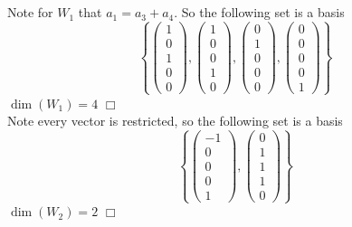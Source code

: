 \documentclass{article}
\begin{document}
\section{}
Note for $W_1$ that $a_1 = a_3 + a_4$. So the following set is a basis
$$\left\{\left(\begin{matrix}1\\0\\1\\0\\0\end{matrix}\right), \left(\begin{matrix}1\\0\\0\\1\\0\end{matrix} \right), \left(\begin{matrix}0\\1\\0\\0\\0\end{matrix}\right), \left(\begin{matrix}0\\0\\0\\0\\1\end{matrix}\right) \right\}$$
$\dim{(W_1)} = 4$ $\Box$\\
Note every vector is restricted, so the following set is a basis
$$\left\{ \left(\begin{matrix}-1\\0\\0\\0\\1\end{matrix}\right), \left(\begin{matrix}0\\1\\1\\1\\0\end{matrix}\right) \right\}$$
$\dim{(W_2)} = 2$ $\Box$
\end{document}
